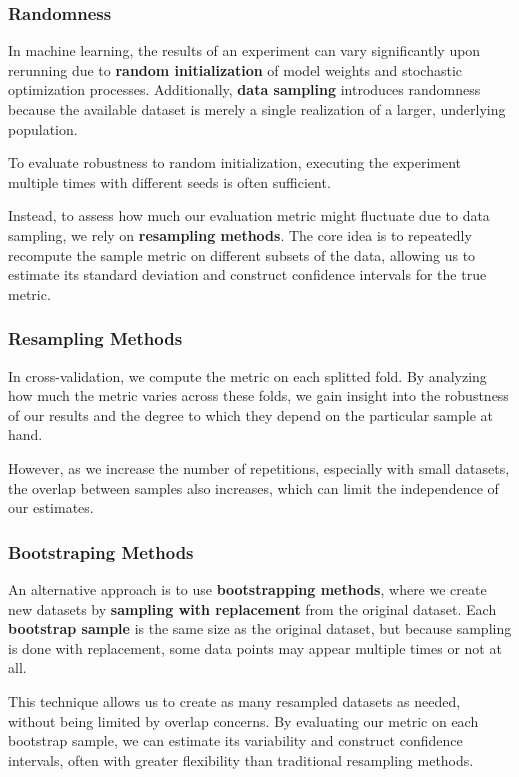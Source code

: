 \subsubsection{Randomness}
In machine learning, the results of an experiment can vary significantly upon rerunning due to \textbf{random initialization} 
of model weights and stochastic optimization processes. 
Additionally, \textbf{data sampling} introduces randomness because the available dataset is merely a single realization of a larger, underlying population.

To evaluate robustness to random initialization, executing the experiment multiple times with different seeds is often sufficient. 

Instead, to assess how much our evaluation metric might fluctuate due to data sampling, we rely on \textbf{resampling methods}.
The core idea is to repeatedly recompute the sample metric on different subsets of the data, allowing us to estimate its standard deviation and construct confidence intervals for the true metric.
\subsubsection*{Resampling Methods}
In cross-validation, we compute the metric on each splitted fold.
By analyzing how much the metric varies across these folds, we gain insight into the robustness of our results 
and the degree to which they depend on the particular sample at hand.

However, as we increase the number of repetitions, especially with small datasets, 
the overlap between samples also increases, which can limit the independence of our estimates.

\subsubsection*{Bootstraping Methods}
An alternative approach is to use \textbf{bootstrapping methods}, where we create new datasets by \textbf{sampling with replacement} from the original dataset.
Each \textbf{bootstrap sample} is the same size as the original dataset, but because sampling is done with replacement, some data points may appear multiple times or not at all.

This technique allows us to create as many resampled datasets as needed, without being limited by overlap concerns.
By evaluating our metric on each bootstrap sample, we can estimate its variability and construct confidence intervals, 
often with greater flexibility than traditional resampling methods.

